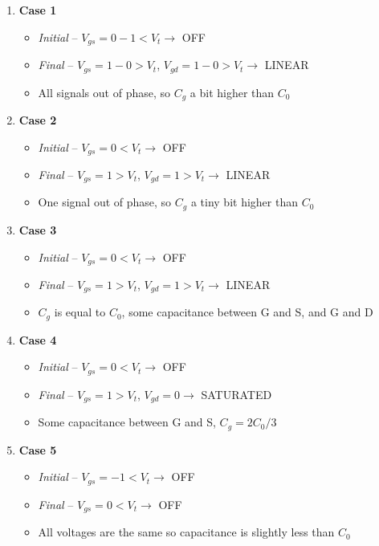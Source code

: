 \documentclass{article}
\begin{document}
\small
\begin{enumerate}

\item \textbf{Case 1} \begin{itemize}
\item \textit{Initial} -- $V_{gs} = 0 - 1 < V_t \rightarrow$ OFF

\item \textit{Final} -- $V_{gs} = 1 - 0 > V_t$, $V_{gd} = 1 - 0 > V_t \rightarrow$ LINEAR

\item All signals out of phase, so $C_g$ a bit higher than $C_0$
\end{itemize}

\item \textbf{Case 2} \begin{itemize}
\item \textit{Initial} -- $V_{gs} = 0 < V_t \rightarrow$ OFF

\item \textit{Final} -- $V_{gs} = 1 > V_t$, $V_{gd} = 1 > V_t \rightarrow$ LINEAR

\item One signal out of phase, so $C_g$ a tiny bit higher than $C_0$
\end{itemize}

\item \textbf{Case 3} \begin{itemize}
\item \textit{Initial} -- $V_{gs} = 0 < V_t \rightarrow$ OFF

\item \textit{Final} -- $V_{gs} = 1 > V_t$, $V_{gd} = 1 > V_t \rightarrow$ LINEAR

\item $C_g$ is equal to $C_0$, some capacitance between G and S, and G and D 
\end{itemize}

\item \textbf{Case 4} \begin{itemize}
\item \textit{Initial} -- $V_{gs} = 0 < V_t \rightarrow$ OFF
\item \textit{Final} -- $V_{gs} = 1 > V_t$, $V_{gd} = 0 \rightarrow$ SATURATED
\item Some capacitance between G and S, $C_g = 2C_0/3$
\end{itemize}

\item \textbf{Case 5} \begin{itemize}
\item \textit{Initial} -- $V_{gs} = -1 < V_t \rightarrow$ OFF
\item \textit{Final} -- $V_{gs} = 0 < V_t \rightarrow$ OFF 
\item All voltages are the same so capacitance is slightly less than $C_0$
\end{itemize}


\end{enumerate}
\end{document}
